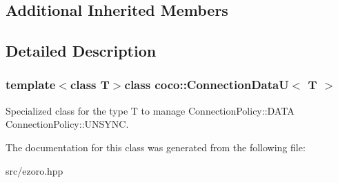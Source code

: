 \subsection*{Additional Inherited Members}


\subsection{Detailed Description}
\subsubsection*{template$<$class T$>$class coco\-::\-Connection\-Data\-U$<$ T $>$}

Specialized class for the type T to manage Connection\-Policy\-::\-D\-A\-T\-A Connection\-Policy\-::\-U\-N\-S\-Y\-N\-C. 

The documentation for this class was generated from the following file\-:\begin{DoxyCompactItemize}
\item 
src/ezoro.\-hpp\end{DoxyCompactItemize}

